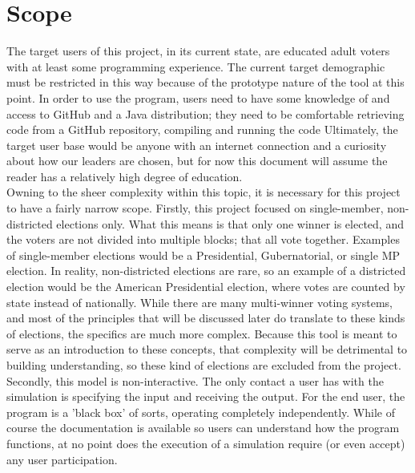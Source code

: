 \documentclass[12pt]{article}
\begin{document}
\section{Scope} \label{Scope}
\qquad The target users of this project, in its current state, are educated adult voters with at least some programming experience. The current target demographic must be restricted in this way because of the prototype nature of the tool at this point. In order to use the program, users need to have some knowledge of and access to GitHub and a Java distribution; they need to be comfortable retrieving code from a GitHub repository, compiling and running the code Ultimately, the target user base would be anyone with an internet connection and a curiosity about how our leaders are chosen, but for now this document will assume the reader has a relatively high degree of education. \\

\qquad Owning to the sheer complexity within this topic, it is necessary for this project to have a fairly narrow scope. Firstly, this project focused on single-member, non-districted elections only. What this means is that only one winner is elected, and the voters are not divided into multiple blocks; that all vote together. Examples of single-member elections would be a Presidential, Gubernatorial, or single MP election. In reality, non-districted elections are rare, so an example of a districted election would be the American Presidential election, where votes are counted by state instead of nationally. While there are many multi-winner voting systems, and most of the principles that will be discussed later do translate to these kinds of elections, the specifics are much more complex. Because this tool is meant to serve as an introduction to these concepts, that complexity will be detrimental to building understanding, so these kind of elections are excluded from the project. \\

\qquad Secondly, this model is non-interactive. The only contact a user has with the simulation is specifying the input and receiving the output. For the end user, the program is a 'black box' of sorts, operating completely independently. While of course the documentation is available so users can understand how the program functions, at no point does the execution of a simulation require (or even accept) any user participation. \\
\end{document}
